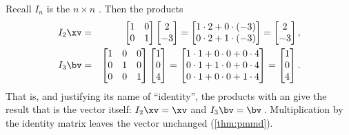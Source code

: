 \begin{example} 
Recall \(I_n\) is the \(n\times n\) . 
Then the products
\begin{eqnarray*}
I_2\xv&=&\begin{bmatrix} 1&0\\ 0&1 \end{bmatrix}
\begin{bmatrix} 2\\-3 \end{bmatrix}
=\begin{bmatrix} 1\cdot2+0\cdot(-3)\\ 0\cdot2+1\cdot(-3) \end{bmatrix}
=\begin{bmatrix} 2\\ -3 \end{bmatrix},
\\
I_3\bv&=&\begin{bmatrix} 1 & 0 & 0\\ 0 & 1 & 0\\0&0&1 \end{bmatrix}
\begin{bmatrix} 1\\0\\4 \end{bmatrix}
=\begin{bmatrix} 1\cdot1+0\cdot0 + 0\cdot4\\ 0\cdot1 + 1\cdot0 + 0\cdot4\\ 0\cdot1 + 0\cdot0 + 1\cdot4 \end{bmatrix}
=\begin{bmatrix} 1\\0\\4 \end{bmatrix}.
\end{eqnarray*}
That is, and justifying its name of ``identity'', the products with an  give the result that is the vector itself: \(I_2\xv=\xv\) and \(I_3\bv=\bv\)\,.
Multiplication by the identity matrix leaves the vector unchanged (\cref{thm:pmmd}).
\end{example}




